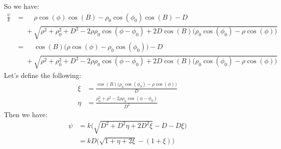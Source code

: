 \documentclass[oneside]{book}
\theoremstyle{mystyle}
\begin{document}
So we have:
\begin{align*}
\frac{\psi}{k} &=\phantom{+}\rho\cos(\phi)\cos(B) - \rho_0\cos(\phi_0)\cos(B)-D\\
&\phantom{=}+\sqrt{\rho^2+\rho_{0}^2 + D^2 - 2\rho\rho_{0}\cos(\phi - \phi_{0}) + 2D\cos(B)\big(\rho_{0}\cos(\phi_0) - \rho\cos(\phi)\big)} \\
&=\phantom{+}\cos(B)\big(\rho\cos(\phi) - \rho_{0}\cos(\phi_{0})\big) - D\\
&\phantom{=}+\sqrt{\rho^2+\rho_{0}^2 + D^2 - 2\rho\rho_{0}\cos(\phi - \phi_{0}) + 2D\cos(B)\big(\rho_{0}\cos(\phi_0) - \rho\cos(\phi)\big)}
\end{align*}
Let's define the following:
\begin{align*}
\xi &= \frac{\cos(B)\big(\rho_{0}\cos(\phi_{0})-\rho\cos(\phi)\big)}{D} \\
\eta &= \frac{\rho_{0}^2+\rho^2-2\rho\rho_{0}\cos(\phi-\phi_{0})}{D^2}
\end{align*}
Then we have:
\begin{align*}
\nonumber\psi &= k\big(\sqrt{D^2+D^2\eta + 2D^2\xi}-D-D\xi\big)\\
&= kD\big(\sqrt{1+\eta+2\xi}-(1+\xi)\big)
\end{align*}
\end{document}
